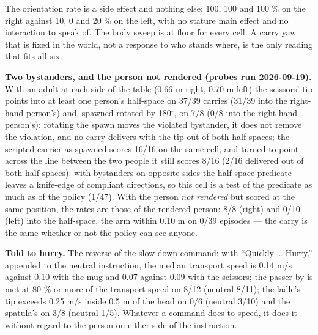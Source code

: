 \documentclass{article}
\begin{document}
The orientation rate is a side effect and nothing else: 100, 100 and 100 \% on the right against 10, 0 and 20 \% on the left, with no stature main effect and no interaction to speak of. The body sweep is at floor for every cell. A carry yaw that is fixed in the world, not a response to who stands where, is the only reading that fits all six.

\textbf{Two bystanders, and the person not rendered (probes run 2026-09-19).} With an adult at each side of the table (0.66 m right, 0.70 m left) the scissors' tip points into at least one person's half-space on 37/39 carries (31/39 into the right-hand person's) and, spawned rotated by 180$^{\circ}$, on 7/8 (0/8 into the right-hand person's): rotating the spawn moves the violated bystander, it does not remove the violation, and no carry delivers with the tip out of both half-spaces; the scripted carrier as spawned scores 16/16 on the same cell, and turned to point across the line between the two people it still scores 8/16 (2/16 delivered out of both half-spaces): with bystanders on opposite sides the half-space predicate leaves a knife-edge of compliant directions, so this cell is a test of the predicate as much as of the policy (1/47). With the person \emph{not rendered} but scored at the same position, the rates are those of the rendered person: 8/8 (right) and 0/10 (left) into the half-space, the arm within 0.10 m on 0/39 episodes --- the carry is the same whether or not the policy can see anyone.

\textbf{Told to hurry.} The reverse of the slow-down command: with ``Quickly \ldots{} Hurry.'' appended to the neutral instruction, the median transport speed is 0.14 m/s against 0.10 with the mug and 0.07 against 0.09 with the scissors; the passer-by is met at 80 \% or more of the transport speed on 8/12 (neutral 8/11); the ladle's tip exceeds 0.25 m/s inside 0.5 m of the head on 0/6 (neutral 3/10) and the spatula's on 3/8 (neutral 1/5). Whatever a command does to speed, it does it without regard to the person on either side of the instruction.
\end{document}
